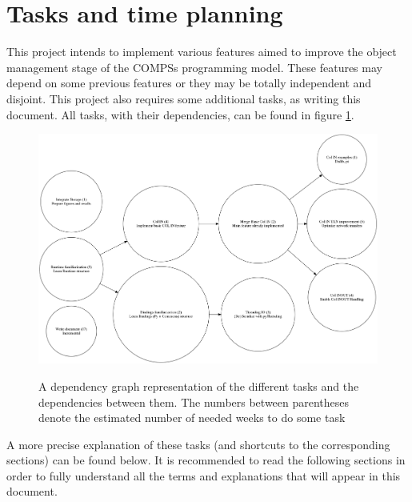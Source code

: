\section{Tasks and time planning}
\label{sec:tasks_and_time_planning}
This project intends to implement various features aimed to improve the object management stage of the COMPSs programming model. These features may depend on some previous features or they may be totally independent and disjoint. This project also requires some additional tasks, as writing this document. All tasks, with their dependencies, can be found in figure \ref{fig:thesis_task_graph}.

\begin{figure}[ht!]
\includegraphics[scale = 0.20]{figures/thesis_task_graph.png}
\label{fig:thesis_task_graph}
\caption{A dependency graph representation of the different tasks and the dependencies between them. The numbers between parentheses denote the estimated number of needed weeks to do some task}
\end{figure}

A more precise explanation of these tasks (and shortcuts to the corresponding sections) can be found below. It is recommended to read the following sections in order to fully understand all the terms and explanations that will appear in this document.

